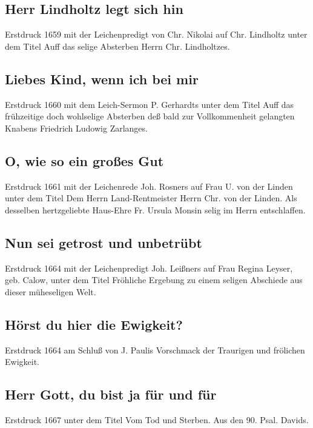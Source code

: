 \subsection*{ Herr Lindholtz legt sich hin}

Erstdruck 1659 mit der Leichenpredigt von Chr. Nikolai auf Chr.
Lindholtz unter dem Titel \frqq Auff das selige Absterben Herrn Chr.
Lindholtzes\flqq .

\subsection*{ Liebes Kind, wenn ich bei mir}

Erstdruck 1660 mit dem Leich-Sermon P. Gerhardts unter dem Titel \frqq Auff
das frühzeitige doch wohlselige Absterben deß bald zur Vollkommenheit
gelangten Knabens Friedrich Ludowig Zarlanges\flqq .

\subsection*{ O, wie so ein großes Gut}

Erstdruck 1661 mit der Leichenrede Joh. Rosners auf Frau U. von der
Linden unter dem Titel \frqq Dem Herrn Land-Rentmeister Herrn Chr. von der
Linden. Als desselben hertzgeliebte Haus-Ehre Fr. Ursula Monsin selig im
Herrn entschlaffen\flqq .

\subsection*{ Nun sei getrost und unbetrübt}

Erstdruck 1664 mit der Leichenpredigt Joh. Leißners auf Frau Regina
Leyser, geb. Calow, unter dem Titel \frqq Fröhliche Ergebung zu einem seligen
Abschiede aus dieser müheseligen Welt\flqq .

\subsection*{ Hörst du hier die Ewigkeit?}

Erstdruck 1664 am Schluß von J. Paulis \frqq Vorschmack der Traurigen und
frölichen Ewigkeit\flqq .

\subsection*{ Herr Gott, du bist ja für und für}

Erstdruck 1667 unter dem Titel \frqq Vom Tod und Sterben. Aus den 90. Psal.
Davids\flqq .

